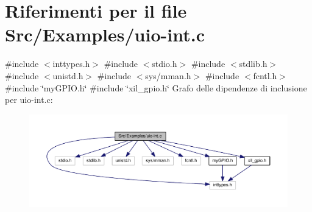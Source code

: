 \hypertarget{uio-int_8c}{}\section{Riferimenti per il file Src/\+Examples/uio-\/int.c}
\label{uio-int_8c}
{\ttfamily \#include $<$inttypes.\+h$>$}\newline
{\ttfamily \#include $<$stdio.\+h$>$}\newline
{\ttfamily \#include $<$stdlib.\+h$>$}\newline
{\ttfamily \#include $<$unistd.\+h$>$}\newline
{\ttfamily \#include $<$sys/mman.\+h$>$}\newline
{\ttfamily \#include $<$fcntl.\+h$>$}\newline
{\ttfamily \#include \char`\"{}my\+G\+P\+I\+O.\+h\char`\"{}}\newline
{\ttfamily \#include \char`\"{}xil\+\_\+gpio.\+h\char`\"{}}\newline
Grafo delle dipendenze di inclusione per uio-\/int.c\+:\nopagebreak
\begin{figure}[H]
\begin{center}
\leavevmode
\includegraphics[width=350pt]{uio-int_8c__incl}
\end{center}
\end{figure}

